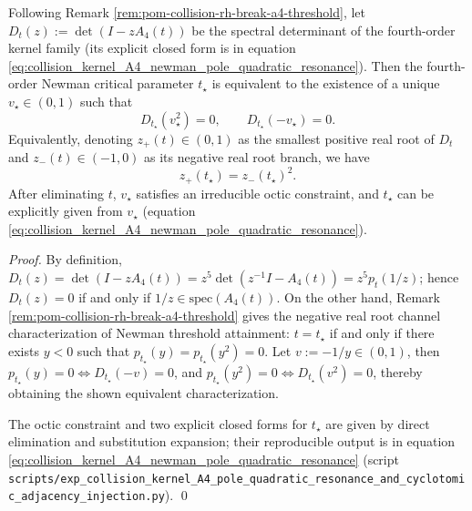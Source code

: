 %
\begin{proposition}[Newman Critical Pole Quadratic Resonance Characterization: \texorpdfstring{$D_t(v^2)=D_t(-v)=0$}{Dt(v^2)=Dt(-v)=0}]\label{prop:pom-a4t-newman-pole-quadratic-resonance}
Following Remark \ref{rem:pom-collision-rh-break-a4-threshold}, let
\(
D_t(z):=\det(I-zA_4(t))
\)
be the spectral determinant of the fourth-order kernel family (its explicit closed form is in equation \eqref{eq:collision_kernel_A4_newman_pole_quadratic_resonance}).
Then the fourth-order Newman critical parameter \(t_\star\) is equivalent to the existence of a unique \(v_\star\in(0,1)\) such that
\[
D_{t_\star}(v_\star^2)=0,\qquad D_{t_\star}(-v_\star)=0.
\]
Equivalently, denoting \(z_+(t)\in(0,1)\) as the smallest positive real root of \(D_t\) and \(z_-(t)\in(-1,0)\) as its negative real root branch, we have
\[
z_+(t_\star)=z_-(t_\star)^2.
\]
After eliminating \(t\), \(v_\star\) satisfies an irreducible octic constraint, and \(t_\star\) can be explicitly given from \(v_\star\) (equation \eqref{eq:collision_kernel_A4_newman_pole_quadratic_resonance}).
\end{proposition}
\begin{proof}
By definition,
\(
D_t(z)=\det(I-zA_4(t))=z^5\det(z^{-1}I-A_4(t))=z^5p_t(1/z)
\);
hence \(D_t(z)=0\) if and only if \(1/z\in\mathrm{spec}(A_4(t))\).
On the other hand, Remark \ref{rem:pom-collision-rh-break-a4-threshold} gives the negative real root channel characterization of Newman threshold attainment: \(t=t_\star\) if and only if there exists \(y<0\) such that \(p_{t_\star}(y)=p_{t_\star}(y^2)=0\).
Let \(v:=-1/y\in(0,1)\), then \(p_{t_\star}(y)=0\iff D_{t_\star}(-v)=0\), and \(p_{t_\star}(y^2)=0\iff D_{t_\star}(v^2)=0\), thereby obtaining the shown equivalent characterization.
\par
The octic constraint and two explicit closed forms for \(t_\star\) are given by direct elimination and substitution expansion; their reproducible output is in equation \eqref{eq:collision_kernel_A4_newman_pole_quadratic_resonance} (script \texttt{scripts/exp\_collision\_kernel\_A4\_pole\_quadratic\_resonance\_and\_cyclotomic\_adjacency\_injection.py}). \qed
\end{proof}




